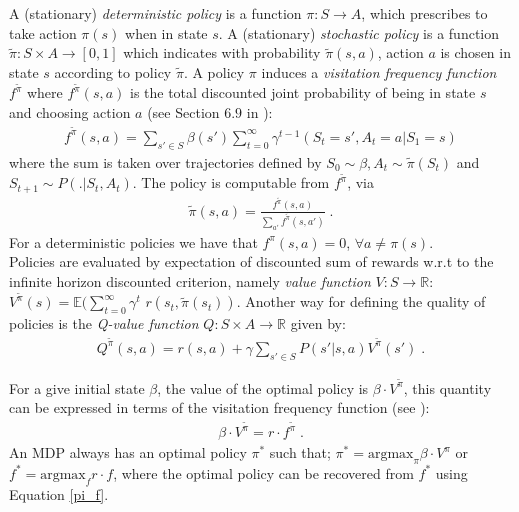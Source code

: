 \documentclass[sigconf]{aamas}  %
\begin{document}
A (stationary) \textit{deterministic policy} is a function $\pi: S \longrightarrow A$, which prescribes to take action $\pi(s)$ when in state $s$. A (stationary) \textit{stochastic policy} is a function $\tilde{\pi}: S \times A \longrightarrow [0,1]$ which indicates with probability $\tilde{\pi} (s,a)$, action $a$ is chosen in state $s$ according to policy $\tilde{\pi}$. A policy $\pi$ induces a \textit{visitation frequency function} $f^{\tilde{\pi}}$ where $f^{\tilde{\pi}}(s,a)$ is the total discounted joint probability of being in state $s$ and choosing action $a$ (see Section $6.9$ in \cite{Puterman1994}):
\begin{align*}
f^{\tilde{\pi}}(s, a) = \sum_{s' \in S} \beta(s') \sum_{t=0}^{\infty} \gamma^{t-1}(S_t = s', A_t = a | S_1 = s)
\end{align*}
where the sum is taken over trajectories defined by $S_0 \sim \beta, A_t \sim \tilde{\pi}(S_t)$ and $S_{t+1} \sim P(.|S_t,A_t)$. The policy is computable from $f^{\tilde{\pi}}$, via 
\begin{align}\label{pi_f}
\tilde{\pi}(s,a) = \frac{f^{\tilde{\pi}}(s, a)}{\sum_{a'} f^{\tilde{\pi}} (s,a')}\;.
\end{align}
For a deterministic policies we have that $f^{\pi}(s,a)= 0$, $\forall a \neq \pi(s)$.\\
Policies are evaluated by expectation of discounted sum of rewards w.r.t to the infinite horizon discounted criterion, namely \textit{value function} $V: S \longrightarrow \mathbb{R}$: 
$V^{\tilde{\pi}}(s) = \mathbb{E}(\sum_{t=0}^{\infty} \gamma^{t}$ $r(s_t, \tilde{\pi}(s_t))$. %
Another way for defining the quality of policies is the \textit{Q-value function}   $Q: S \times A \longrightarrow \mathbb{R}$ given by:
\begin{align}\label{q-v}
Q^{\tilde{\pi}}(s, a) = r(s, a) + \gamma \sum_{s' \in S} P(s'|s,a)V^{\tilde{\pi}}(s')\;.
\end{align}

For a give initial state $\beta$, the value of the optimal policy is $\beta \cdot V^{\tilde{\pi}}$, this quantity can be expressed in terms of the visitation frequency function (see \cite{Puterman1994}): 
\begin{align}\label{f-v}
\beta \cdot V^{\tilde{\pi}} = r \cdot f^{\tilde{\pi}}\;.
\end{align}
An MDP always has an optimal policy $\pi^*$ such that; $\pi^* = \text{argmax}_{\pi} \beta \cdot V^{\pi}$ or $f^{*} = \text{argmax}_{f} r \cdot f$, where the optimal policy can be recovered from $f^*$ using Equation \ref{pi_f}. 
\end{document}
